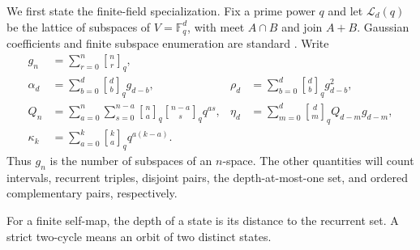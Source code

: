 \documentclass[a4paper,10pt]{amsart}
\theoremstyle{remark}
\newcommand{\F}{\mathbb F}
\newcommand{\cL}{\mathcal L}
\newcommand{\qbinom}[2]{\genfrac{[}{]}{0pt}{}{#1}{#2}_{q}}
\newcommand{\meet}{\mathbin{\cap}}
\newcommand{\join}{\mathbin{+}}
\begin{document}
We first state the finite-field specialization.  Fix a prime power $q$ and
let $\cL_d(q)$ be the lattice of subspaces of $V=\F_q^d$, with meet
$A\meet B$ and join $A\join B$.  Gaussian coefficients and finite subspace
enumeration are standard \cite{GoldmanRota1970,ChajdaLanger2019}.  Write
\begin{align}
 g_n&=\sum_{r=0}^n\qbinom nr,\label{eq:galois}\\
 \alpha_d&=\sum_{b=0}^d\qbinom db g_{d-b},&
 \rho_d&=\sum_{b=0}^d\qbinom db g_{d-b}^{2},\label{eq:alpha-rho}\\
 Q_n&=\sum_{a=0}^n\sum_{s=0}^{n-a}
       \qbinom na\qbinom{n-a}s q^{as},&
 \eta_d&=\sum_{m=0}^d\qbinom dm Q_{d-m}g_{d-m},\label{eq:q-eta}\\
 \kappa_k&=\sum_{a=0}^k\qbinom ka q^{a(k-a)}.\label{eq:kappa}
\end{align}
Thus $g_n$ is the number of subspaces of an $n$-space.  The other quantities
will count intervals, recurrent triples, disjoint pairs, the depth-at-most-one
set, and ordered complementary pairs, respectively.

For a finite self-map, the depth of a state is its distance to the recurrent
set.  A strict two-cycle means an orbit of two distinct states.
\end{document}
